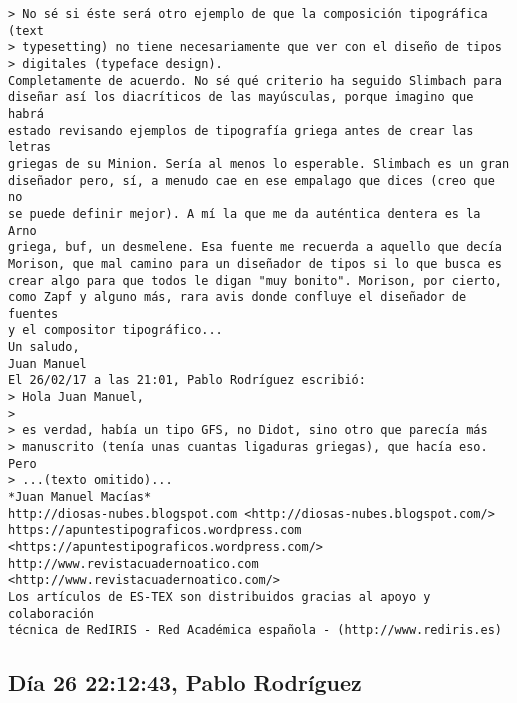 \documentclass[a4paper,10pt]{article}
\begin{document}
\begin{lstlisting}
> No sé si éste será otro ejemplo de que la composición tipográfica (text
> typesetting) no tiene necesariamente que ver con el diseño de tipos
> digitales (typeface design).
Completamente de acuerdo. No sé qué criterio ha seguido Slimbach para 
diseñar así los diacríticos de las mayúsculas, porque imagino que habrá 
estado revisando ejemplos de tipografía griega antes de crear las letras 
griegas de su Minion. Sería al menos lo esperable. Slimbach es un gran 
diseñador pero, sí, a menudo cae en ese empalago que dices (creo que no 
se puede definir mejor). A mí la que me da auténtica dentera es la Arno 
griega, buf, un desmelene. Esa fuente me recuerda a aquello que decía 
Morison, que mal camino para un diseñador de tipos si lo que busca es 
crear algo para que todos le digan "muy bonito". Morison, por cierto, 
como Zapf y alguno más, rara avis donde confluye el diseñador de fuentes 
y el compositor tipográfico...
Un saludo,
Juan Manuel
El 26/02/17 a las 21:01, Pablo Rodríguez escribió:
> Hola Juan Manuel,
>
> es verdad, había un tipo GFS, no Didot, sino otro que parecía más
> manuscrito (tenía unas cuantas ligaduras griegas), que hacía eso. Pero
> ...(texto omitido)...
*Juan Manuel Macías*
http://diosas-nubes.blogspot.com <http://diosas-nubes.blogspot.com/>
https://apuntestipograficos.wordpress.com 
<https://apuntestipograficos.wordpress.com/>
http://www.revistacuadernoatico.com <http://www.revistacuadernoatico.com/>
Los artículos de ES-TEX son distribuidos gracias al apoyo y colaboración 
técnica de RedIRIS - Red Académica española - (http://www.rediris.es)

\end{lstlisting}

\subsection{Día 26 22:12:43, Pablo Rodríguez}
\end{document}
